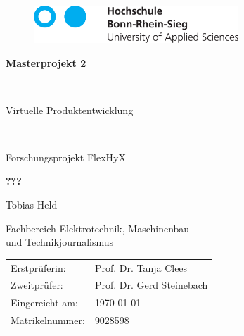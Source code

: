 \begin{titlepage}
	\begin{figure}[htbp]
		\includegraphics[height=1.4cm]{Kapitel/xx_Logo_HBRS_74mm_Pfade-eps-converted-to.pdf}
	\end{figure}
  \linespread{1.4}%
  \vspace{2cm}
  \begin{center}

    \begin{Huge}\textbf{Masterprojekt 2}\end{Huge} \\
    \vspace{1cm}
    \begin{Large}{Virtuelle Produktentwicklung}\end{Large} \\
    \begin{large}
    	Forschungsprojekt FlexHyX
    \end{large}

    \vspace{0.7cm}
    \linespread{1.2}%
    \begin{huge}
      \textbf{???\\}
    \end{huge}
    \linespread{1.5}%
    \normalsize
    \vspace{1cm}%

    \begin{Large}{Tobias Held \\}
    \end{Large}

    \begin{Large}%
        Fachbereich Elektrotechnik, Maschinenbau \\ und Technikjournalismus
    \end{Large}
  \end{center}

  \vspace{3.0cm}

  \begin{large}
    {
      \begin{tabular}{ll}
      Erstprüferin:  & Prof. Dr. Tanja Clees \\
      Zweitprüfer: & Prof. Dr. Gerd Steinebach \\
      Eingereicht am: & \today \\%
      Matrikelnummer: & 9028598
      \end{tabular}
	}
  \end{large}

\end{titlepage}